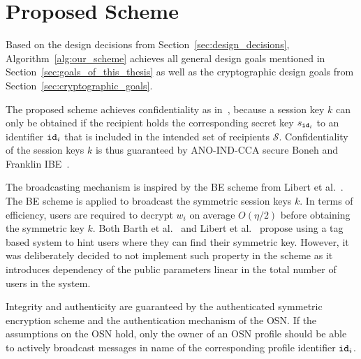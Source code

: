 

\section{Proposed Scheme}
\label{sec:proposed_scheme}
Based on the design decisions from Section~\ref{sec:design_decisions}, Algorithm~\ref{alg:our_scheme} achieves all general design goals mentioned in Section~\ref{sec:goals_of_this_thesis} as well as the cryptographic design goals from Section~\ref{sec:cryptographic_goals}.

The proposed scheme achieves confidentiality as in~\cite{art:BonehF01,art:LibertPQ12}, because a session key $k$ can only be obtained if the recipient holds the corresponding secret key $s_{\mathtt{id}_{i}}$ to an identifier $\mathtt{id}_{i}$ that is included in the intended set of recipients $\mathcal{S}$. Confidentiality of the session keys $k$ is thus guaranteed by ANO-IND-CCA secure Boneh and Franklin IBE~\cite{art:BonehF01}. 

The broadcasting mechanism is inspired by the BE scheme from Libert et al.~\cite{art:LibertPQ12}. The BE scheme is applied to broadcast the symmetric session keys $k$. In terms of efficiency, users are required to decrypt $w_i$ on average $O\left( \eta /2 \right)$ before obtaining the symmetric key $k$. Both Barth et al.~\cite{art:BarthBW06} and Libert et al.~\cite{art:LibertPQ12} propose using a tag based system to hint users where they can find their symmetric key. However, it was deliberately decided to not implement such property in the scheme as it introduces dependency of the public parameters linear in the total number of users in the system.

Integrity and authenticity are guaranteed by the authenticated symmetric encryption scheme and the authentication mechanism of the OSN. If the assumptions on the OSN hold, only the owner of an OSN profile should be able to actively broadcast messages in name of the corresponding profile identifier $\mathtt{id}_{i}$.

